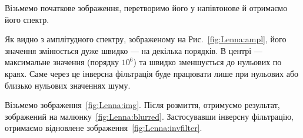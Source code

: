 \documentclass{diploma}
\begin{document}
      Візьмемо початкове зображення, перетворимо його у напівтонове й
      отримаємо його спектр.
      \begin{figure}[ht]
        \hfill
        \hfill
      \end{figure}

      Як видно з амплітудного спектру, зображеному на
      Рис.~\ref{fig:Lenna:ampl}, його значення змінюється дуже швидко ---
      на декілька порядків.
      В центрі --- максимальне значення (порядку $10^6$) та швидко зменшується
      до нульових по краях.
      Саме через це інверсна фільтрація буде працювати лише при нульових або
      близько нульових значеннях шуму.

      Візьмемо зображення~\ref{fig:Lenna:img}.
      Після розмиття, отримуємо результат, зображений на
      малюнку~\ref{fig:Lenna:blurred}.
      Застосувавши інверсну фільтрацію, отримаємо відновлене
      зображення~\ref{fig:Lenna:invfilter}.
\end{document}
